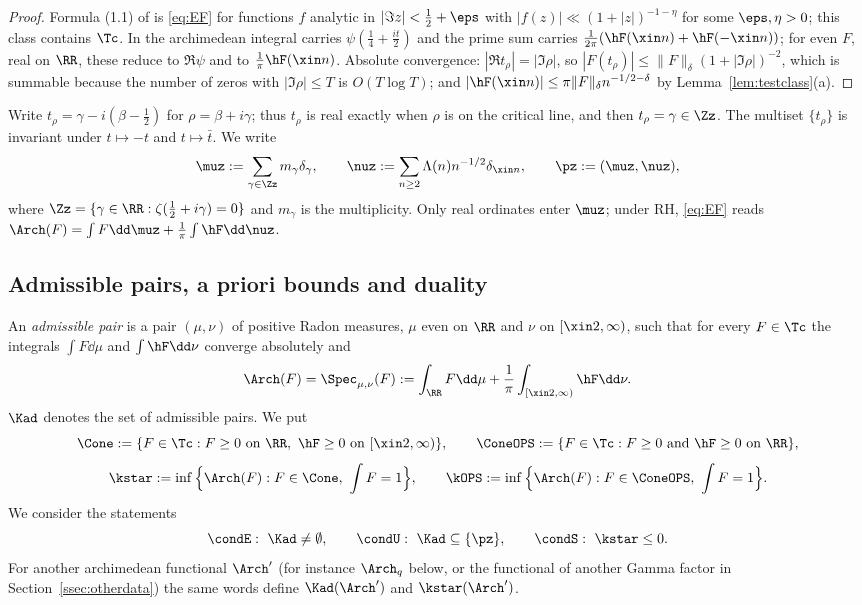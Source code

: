 \begin{proof}
Formula (1.1) of \cite{BRS} is \eqref{eq:EF} for functions $f$ analytic in $|\Im z|<\frac12+\eps$ with
$|f(z)|\ll(1+|z|)^{-1-\eta}$ for some $\eps,\eta>0$; this class contains $\Tc$. In \cite{BRS} the archimedean
integral carries $\psi(\frac14+\frac{it}2)$ and the prime sum carries $\frac1{2\pi}(\hF(\xin n)+\hF(-\xin n))$; for even
$F$, real on $\RR$, these reduce to $\Re\psi$ and to $\frac1\pi\hF(\xin n)$. Absolute convergence: $|\Re t_\rho|=|\Im\rho|$,
so $|F(t_\rho)|\le\|F\|_\delta(1+|\Im\rho|)^{-2}$, which is summable because the number of zeros with
$|\Im\rho|\le T$ is $O(T\log T)$; and $|\hF(\xin n)|\le\pi\|F\|_\delta n^{-1/2-\delta}$ by
Lemma~\ref{lem:testclass}(a).
\end{proof}

Write $t_\rho=\gamma-i(\beta-\frac12)$ for $\rho=\beta+i\gamma$; thus $t_\rho$ is real exactly when $\rho$ is on the
critical line, and then $t_\rho=\gamma\in\Zz$. The multiset $\{t_\rho\}$ is invariant under $t\mapsto-t$ and
$t\mapsto\bar t$. We write
\[
\muz:=\sum_{\gamma\in\Zz}m_\gamma\delta_\gamma,\qquad \nuz:=\sum_{n\ge2}\Lambda(n)n^{-1/2}\delta_{\xin n},\qquad
\pz:=(\muz,\nuz),
\]
where $\Zz=\{\gamma\in\RR:\zeta(\frac12+i\gamma)=0\}$ and $m_\gamma$ is the multiplicity. Only real ordinates enter
$\muz$; under RH, \eqref{eq:EF} reads $\Arch(F)=\int F\dd\muz+\frac1\pi\int\hF\dd\nuz$.

\subsection{Admissible pairs, a priori bounds and duality}

\begin{definition}\label{def:admissible}
An \emph{admissible pair} is a pair $(\mu,\nu)$ of positive Radon measures, $\mu$ even on $\RR$ and $\nu$ on
$[\xin2,\infty)$, such that for every $F\in\Tc$ the integrals $\int F\dd\mu$ and $\int\hF\dd\nu$ converge absolutely and
\[
\Arch(F)=\Spec_{\mu,\nu}(F):=\int_\RR F\dd\mu+\frac1\pi\int_{[\xin2,\infty)}\hF\dd\nu .
\]
$\Kad$ denotes the set of admissible pairs. We put
\[
\Cone:=\{F\in\Tc: F\ge0\text{ on }\RR,\ \hF\ge0\text{ on }[\xin2,\infty)\},\qquad
\ConeOPS:=\{F\in\Tc:F\ge0\text{ and }\hF\ge0\text{ on }\RR\},
\]
\[
\kstar:=\inf\Big\{\Arch(F):F\in\Cone,\ \int F=1\Big\},\qquad \kOPS:=\inf\Big\{\Arch(F):F\in\ConeOPS,\ \int F=1\Big\}.
\]
We consider the statements
\[
\condE:\ \Kad\ne\emptyset,\qquad \condU:\ \Kad\subseteq\{\pz\},\qquad \condS:\ \kstar\le0 .
\]
For another archimedean functional $\Arch'$ (for instance $\Arch_q$ below, or the functional of another Gamma factor
in Section~\ref{ssec:otherdata}) the same words define $\Kad(\Arch')$ and $\kstar(\Arch')$.
\end{definition}

